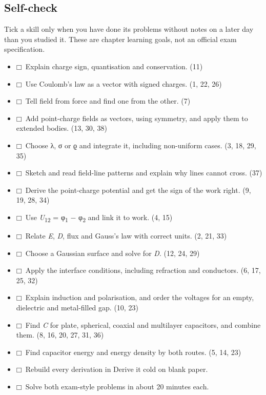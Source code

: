 \documentclass[11pt]{article}
\begin{document}
\begin{keepsection}
\section{Self-check}

Tick a skill only when you have done its problems without notes on a later day than you studied it. These are chapter learning goals, not an official exam specification.

\begin{itemize}[label={}]
\item $\mdlgwhtsquare$\ Explain charge sign, quantisation and conservation. (11)
\item $\mdlgwhtsquare$\ Use Coulomb’s law as a vector with signed charges. (1, 22, 26)
\item $\mdlgwhtsquare$\ Tell field from force and find one from the other. (7)
\item $\mdlgwhtsquare$\ Add point-charge fields as vectors, using symmetry, and apply them to extended bodies. (13, 30, 38)
\item $\mdlgwhtsquare$\ Choose λ, σ or ϱ and integrate it, including non-uniform cases. (3, 18, 29, 35)
\item $\mdlgwhtsquare$\ Sketch and read field-line patterns and explain why lines cannot cross. (37)
\item $\mdlgwhtsquare$\ Derive the point-charge potential and get the sign of the work right. (9, 19, 28, 34)
\item $\mdlgwhtsquare$\ Use \textit{U}\textsubscript{12} = φ\textsubscript{1} \ensuremath{-} φ\textsubscript{2} and link it to work. (4, 15)
\item $\mdlgwhtsquare$\ Relate \textit{E}, \textit{D}, flux and Gauss’s law with correct units. (2, 21, 33)
\item $\mdlgwhtsquare$\ Choose a Gaussian surface and solve for \textit{D}. (12, 24, 29)
\item $\mdlgwhtsquare$\ Apply the interface conditions, including refraction and conductors. (6, 17, 25, 32)
\item $\mdlgwhtsquare$\ Explain induction and polarisation, and order the voltages for an empty, dielectric and metal-filled gap. (10, 23)
\item $\mdlgwhtsquare$\ Find \textit{C} for plate, spherical, coaxial and multilayer capacitors, and combine them. (8, 16, 20, 27, 31, 36)
\item $\mdlgwhtsquare$\ Find capacitor energy and energy density by both routes. (5, 14, 23)
\item $\mdlgwhtsquare$\ Rebuild every derivation in Derive it cold on blank paper.
\item $\mdlgwhtsquare$\ Solve both exam-style problems in about 20 minutes each.
\end{itemize}
\end{keepsection}
\end{document}
